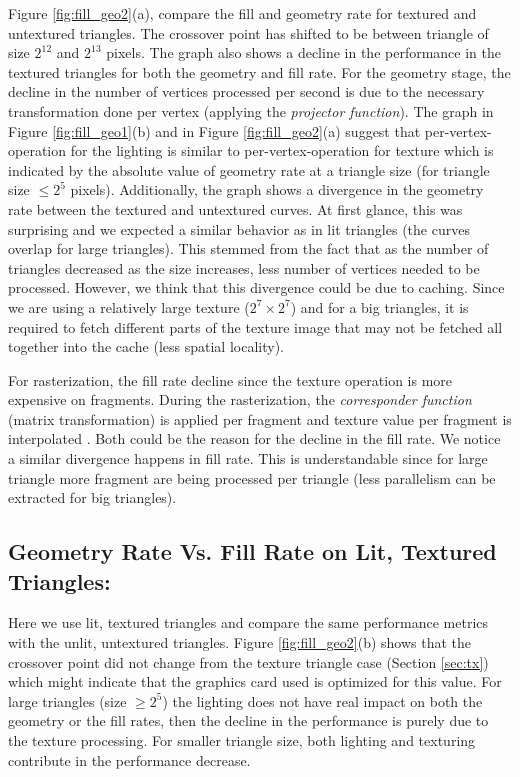 Figure \ref{fig:fill_geo2}(a), compare the fill and geometry rate for textured and untextured triangles. The crossover point has shifted to be between triangle of size $2^{12}$ and $2^{13}$ pixels. The graph also shows a decline in the performance in the textured triangles for both the geometry and fill rate. For the geometry stage, the decline in the number of vertices processed per second is due to the necessary transformation done per vertex (applying the \emph{projector function}\cite{akenine2008real}). The graph in Figure \ref{fig:fill_geo1}(b) and in Figure \ref{fig:fill_geo2}(a) suggest that per-vertex-operation for the lighting is similar to per-vertex-operation for texture which is indicated by the absolute value of geometry rate at a triangle size (for triangle size $\leq 2^{5}$ pixels). Additionally, the graph shows a divergence in the geometry rate between the textured and untextured curves. At first glance, this was surprising and we expected a similar behavior as in lit triangles (the curves overlap for large triangles). This stemmed from the fact that as the number of triangles decreased as the size increases, less number of vertices needed to be processed. However, we think that this divergence could be due to caching. Since we are using a relatively large texture ($2^{7}\times2^{7}$) and for a big triangles, it is required to fetch different parts of the texture image that may not be fetched all together into the cache (less spatial locality).

For rasterization, the fill rate decline since the texture operation is more expensive on fragments. During the rasterization, the \emph{corresponder function} (matrix transformation) is applied per fragment and texture value per fragment is interpolated \cite{akenine2008real}. Both could be the reason for the decline in the fill rate. We notice a similar divergence happens in fill rate. This is understandable since for large triangle more fragment are being processed per triangle (less parallelism can be extracted for big triangles).

\subsection{Geometry Rate Vs. Fill Rate on Lit, Textured Triangles:}
Here we use lit, textured triangles and compare the same performance metrics with the unlit, untextured triangles. Figure \ref{fig:fill_geo2}(b) shows that the crossover point did not change from the texture triangle case (Section \ref{sec:tx}) which might indicate that the graphics card used is optimized for this value. For large triangles (size $\geq 2^{5}$) the lighting does not have real impact on both the geometry or the fill rates, then the decline in the performance is purely due to the texture processing. For smaller triangle size, both lighting and texturing contribute in the performance decrease.
